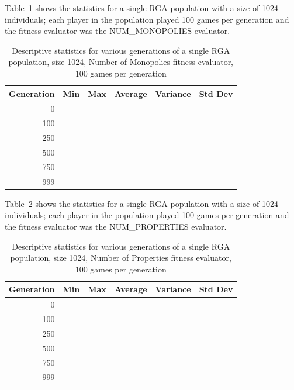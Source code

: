 Table~\ref{table-stats-for-s1024-n100-nm} shows the statistics for a single
RGA population with a size of 1024 individuals; each player in the population
played 100 games per generation and the fitness evaluator was the NUM\_MONOPOLIES
evaluator.

\begin{table}[ht]
\begin{center}
\begin{tabular}{ | r || r | r | r | r | r |}
\hline                        
Generation & Min & Max & Average & Variance & Std Dev \\ \hline \hline
0   & & & & & \\ \hline
100 & & & & & \\ \hline 
250 & & & & & \\ \hline
500 & & & & & \\ \hline
750 & & & & & \\ \hline
999 & & & & & \\ \hline
\end{tabular}
\caption{Descriptive statistics for various generations of a single RGA
population, size 1024, Number of Monopolies fitness evaluator, 100 games per generation}
\label{table-stats-for-s1024-n100-nm}
\end{center}
\end{table}

Table~\ref{table-stats-for-s1024-n100-np} shows the statistics for a single
RGA population with a size of 1024 individuals; each player in the population
played 100 games per generation and the fitness evaluator was the NUM\_PROPERTIES
evaluator.

\begin{table}[ht]
\begin{center}
\begin{tabular}{ | r || r | r | r | r | r |}
\hline                        
Generation & Min & Max & Average & Variance & Std Dev \\ \hline \hline
0   & & & & & \\ \hline
100 & & & & & \\ \hline 
250 & & & & & \\ \hline
500 & & & & & \\ \hline
750 & & & & & \\ \hline
999 & & & & & \\ \hline
\end{tabular}
\caption{Descriptive statistics for various generations of a single RGA
population, size 1024, Number of Properties fitness evaluator, 100 games per generation}
\label{table-stats-for-s1024-n100-np}
\end{center}
\end{table}

